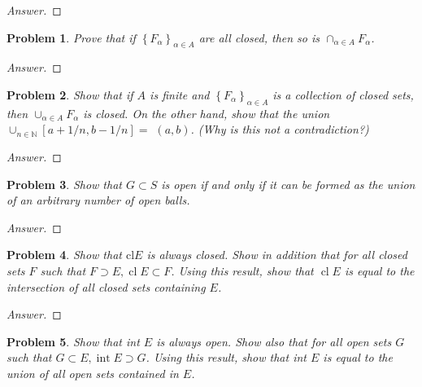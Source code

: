 \documentclass{article}
\newtheorem{problem}{Problem}[section]
\begin{document}
\begin{proof}[Answer]
    
\end{proof}

\begin{problem}
Prove that if $\left\{F_{\alpha}\right\}_{\alpha \in A}$ are all closed, then so is $\cap_{\alpha \in A} F_{\alpha}$.
\end{problem}

\begin{proof}[Answer]
    
\end{proof}

\begin{problem}
Show that if $A$ is finite and $\left\{F_{\alpha}\right\}_{\alpha \in A}$ is a collection of closed sets, then $\cup_{\alpha \in A} F_{\alpha}$ is closed. On the other hand, show that the union $\cup_{n \in \mathbb{N}}[a+1 / n, b-1 / n]=$ $(a, b)$. (Why is this not a contradiction?)
\end{problem}

\begin{proof}[Answer]
    
\end{proof}

\begin{problem}
Show that $G \subset S$ is open if and only if it can be formed as the union of an arbitrary number of open balls.
\end{problem}

\begin{proof}[Answer]
    
\end{proof}

\begin{problem}
Show that $\mathrm{cl} E$ is always closed. Show in addition that for all closed sets $F$ such that $F \supset E, \operatorname{cl} E \subset F$. Using this result, show that $\operatorname{cl} E$ is equal to the intersection of all closed sets containing $E$.
\end{problem}

\begin{proof}[Answer]
    
\end{proof}

\begin{problem}
Show that int $E$ is always open. Show also that for all open sets $G$ such that $G \subset E, \operatorname{int} E \supset G$. Using this result, show that int $E$ is equal to the union of all open sets contained in $E$.
\end{problem}
\end{document}
